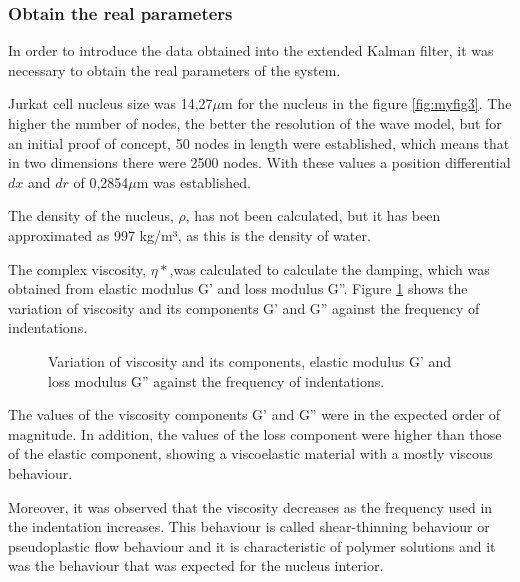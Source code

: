 \documentclass[12pt, a4paper]{article} %
\begin{document}
	\setlength{\parskip}{0mm}
	
	\subsubsection{Obtain the real parameters}
	
	In order to introduce the data obtained into the extended Kalman filter, it was necessary to obtain the real parameters of the system. 
	
	Jurkat cell nucleus size was 14,27$\mu$m for the nucleus in the figure \ref{fig:myfig3}. The higher the number of nodes, the better the resolution of the wave model, but for an initial proof of concept, 50 nodes in length were established, which means that in two dimensions there were 2500 nodes. With these values a position differential $dx$ and $dr$ of 0,2854$\mu$m was established.
	
	\setlength{\parskip}{4mm}
	
	The density of the nucleus, $\rho$, has not been calculated, but it has been approximated as 997 kg/m³, as this is the density of water.
	
	\newpage
	
	The complex viscosity, $\eta *$,was calculated to calculate the damping, which was obtained from elastic modulus G' and loss modulus G''. Figure \ref{fig:vicosidad} shows the variation of viscosity and its components G' and G'' against the frequency of indentations. \setlength{\parskip}{0mm}
	\begin{figure}[H]
		\centering
		
		\caption{Variation of viscosity and its components, elastic modulus G' and loss modulus G'' against the frequency of indentations.}
		\label{fig:vicosidad}
	\end{figure}
	The values of the viscosity components G' and G'' were in the expected order of magnitude. In addition, the values of the loss component were higher than those of the elastic component, showing a viscoelastic material with a mostly viscous behaviour. 
	
	Moreover, it was observed that the viscosity decreases as the frequency used in the indentation increases. This behaviour is called shear-thinning behaviour or pseudoplastic flow behaviour and it is characteristic of polymer solutions \cite{mezger2020rheology} and it was the behaviour that was expected for the nucleus interior. 
	
\end{document}
